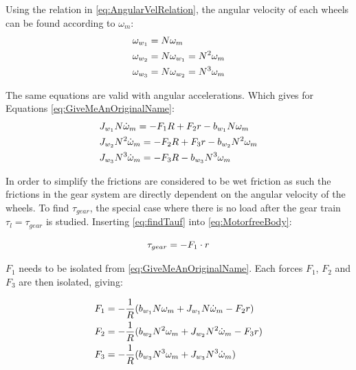 Using the relation in \autoref{eq:AngularVelRelation}, the angular velocity of each wheels can be found according to $\omega_m$:
\begin{subequations} 
	\begin{flalign}
		&\omega_{w_1} = N \omega_m \addunit{\radian\per\second}\\
		&\omega_{w_2} = N \omega_{w_1} = N^2 \omega_m \addunit{\radian\per\second}\\
		&\omega_{w_3} = N \omega_{w_2} = N^3 \omega_m \addunit{\radian\per\second}
	\end{flalign}
\end{subequations}

The same equations are valid with angular accelerations.
Which gives for Equations \ref{eq:GiveMeAnOriginalName}:
\begin{subequations} 
	\begin{flalign}  
		&J_{w_1}N\dot{\omega}_m = -F_1R + F_2r -b_{w_1}N\omega_m \addunit{\newton\meter}\\ 
		&J_{w_2}N^2\dot{\omega}_m = -F_2R + F_3r -b_{w_2}N^2\omega_m  \addunit{\newton\meter}\\ 
		&J_{w_3}N^3\dot{\omega}_m = -F_3R - b_{w_3}N^3\omega_m  \addunit{\newton\meter}
	\end{flalign}
\end{subequations}

In order to simplify the frictions are considered to be wet friction as such the frictions in the gear system are directly dependent on the angular velocity of the wheels. To find $\tau_{gear}$, the special case where there is no load after the gear train $\tau_l = \tau_{gear}$ is studied. Inserting \autoref{eq:findTauf} into \autoref{eq:MotorfreeBody}:

\begin{equation} 
		\tau_{gear} = -F_1 \cdot r \addunit{\newton\meter}
		\label{eq:TaufF1r}
\end{equation}

$F_1$ needs to be isolated from \autoref{eq:GiveMeAnOriginalName}. Each forces $F_1$, $F_2$ and $F_3$ are then isolated, giving: 

\begin{subequations} 
	\begin{flalign}
		&F_1 = -\frac{1}{R} (b_{w_1}N\omega_m + J_{w_1}N\dot{\omega}_m - F_2r) \addunit{\newton} 	\label{eq:F1}\\ 
		&F_2 = -\frac{1}{R} (b_{w_2}N^2\omega_m +  J_{w_2}N^2\dot{\omega}_m - F_3r) \addunit{\newton}	\label{eq:F2}\\
		&F_3 = -\frac{1}{R} (b_{w_3}N^3\omega_m + J_{w_3}N^3\dot{\omega}_m)	\addunit{\newton}		\label{eq:F3}
	\end{flalign}
\end{subequations}


